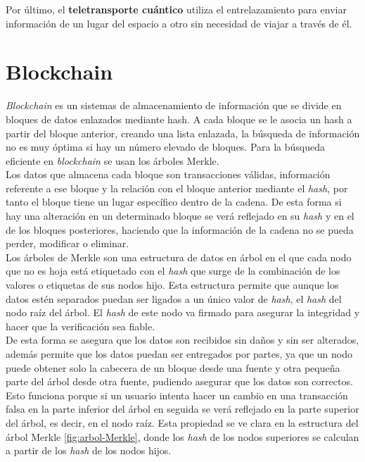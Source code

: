 Por último, el \textbf{teletransporte cuántico} utiliza el entrelazamiento para enviar información de un lugar del espacio a otro sin necesidad de viajar a través de él.\\




\section{Blockchain}\label{sec:intro:blockchain}


\textit{Blockchain} es un sistemas de almacenamiento de información que se divide en bloques de datos enlazados mediante hash. A cada bloque se le asocia un hash a partir del bloque anterior, creando una lista enlazada, la búsqueda de información no es muy óptima si hay un número elevado de bloques. Para la búsqueda eficiente en \textit{blockchain} se usan los árboles Merkle.\\

Los datos que almacena cada bloque son transacciones válidas, información referente a ese bloque y la relación con el bloque anterior mediante el \textit{hash}, por tanto el bloque tiene un lugar específico dentro de la cadena. De esta forma si hay una alteración en un determinado bloque se verá reflejado en su \textit{hash} y en el de los bloques posteriores, haciendo que la información de la cadena no se pueda perder, modificar o eliminar.\\


Los árboles de Merkle \cite{arbol-merkle} son una estructura de datos en árbol en el que cada nodo que no es hoja está etiquetado con el \textit{hash} que surge de la combinación de los valores o etiquetas de sus nodos hijo. Esta estructura permite que aunque los datos estén separados puedan ser ligados a un único valor de \textit{hash}, el \textit{hash} del nodo raíz del árbol. El \textit{hash} de este nodo va firmado para asegurar la integridad y hacer que la verificación sea fiable.\\

De esta forma se asegura que los datos son recibidos sin daños y sin ser alterados, además permite que los datos puedan ser entregados por partes, ya que un nodo puede obtener solo la cabecera de un bloque desde una fuente y otra pequeña parte del árbol desde otra fuente, pudiendo asegurar que los datos son correctos. Esto funciona porque si un usuario intenta hacer un cambio en una transacción falsa en la parte inferior del árbol en seguida se verá reflejado en la parte superior del árbol, es decir, en el nodo raíz. Esta propiedad se ve clara en la estructura del árbol Merkle \ref{fig:arbol-Merkle}, donde los \textit{hash} de los nodos superiores se calculan a partir de los \textit{hash} de los nodos hijos.\\

